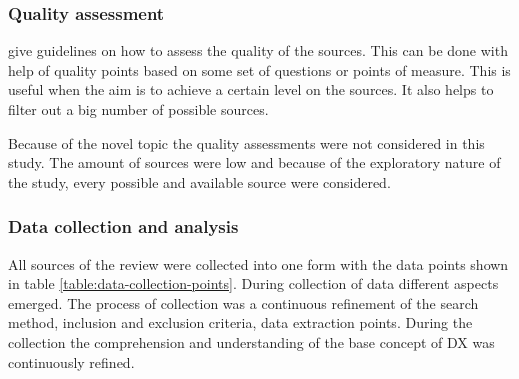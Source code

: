 \documentclass[english, 12pt, a4paper, sci, utf8, a-1b, online]{aaltothesis}
\begin{document}

\subsubsection{Quality assessment}

\cite{guidelines-for-MLR} give guidelines on how to assess the quality of the sources. This can be done with help of quality points based on some set of questions or points of measure. This is useful when the aim is to achieve a certain level on the sources. It also helps to filter out a big number of possible sources.

Because of the novel topic the quality assessments were not considered in this study. The amount of sources were low and because of the exploratory nature of the study, every possible and available source were considered.

\subsubsection{Data collection and analysis}

All sources of the review were collected into one form with the data points shown in table \ref{table:data-collection-points}. During collection of data different aspects emerged. The process of collection was a continuous refinement of the search method, inclusion and exclusion criteria, data extraction points. During the collection the comprehension and understanding of the base concept of DX was continuously refined.
\end{document}
